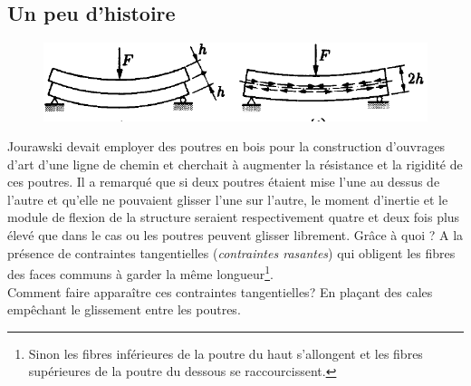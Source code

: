 	\subsection{Un peu d'histoire}		
	\begin{figure}
	\vspace{-7mm}
	\includegraphics[scale=0.4]{ch5/image1.png}
	\end{figure}
	Jourawski devait employer des poutres en bois pour la construction d'ouvrages 
	d'art d'une ligne de chemin et cherchait à augmenter la résistance et la 
	rigidité de ces poutres. Il a remarqué que si deux poutres étaient mise 
	l'une au dessus de l'autre et qu'elle ne pouvaient glisser l'une sur l'autre, 
	le moment d'inertie et le module de flexion de la structure seraient 
	respectivement quatre et deux fois plus élevé que dans le cas ou les poutres 
	peuvent glisser librement.
	Grâce à quoi ? A la présence de contraintes tangentielles (\textit{contraintes 
	rasantes}) qui obligent les fibres des faces communs à garder la même 
	longueur\footnote{Sinon les fibres inférieures de la poutre du haut s'allongent 
	et les fibres supérieures de la poutre du dessous se raccourcissent.}.\\
	Comment faire apparaître ces contraintes tangentielles? En plaçant des cales 
	empêchant le glissement entre les poutres.
	
